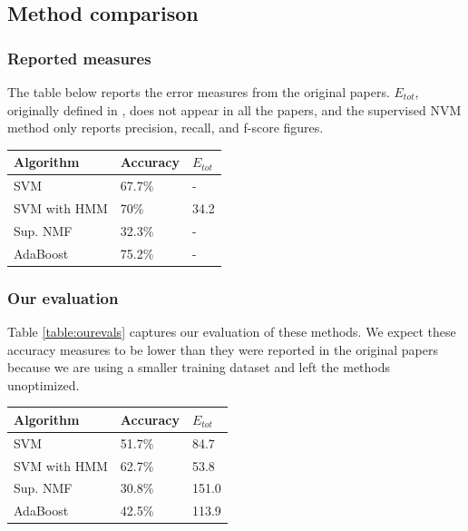 \documentclass[5p]{elsarticle}
\begin{document}
\subsection{Method comparison}

\subsubsection{Reported measures}
The table below reports the error measures from the original papers. $E_{tot}$, originally defined in \citet{poliner2006discriminative}, does not appear in all the papers, and the supervised NVM method only reports precision, recall, and f-score figures. 

\begin{center}
\begin{tabular}{|l|l|l|}
\hline
Algorithm & Accuracy & $E_{tot}$ \\ \hline
SVM & 67.7\% & - \\ \hline
SVM with HMM & 70\% & 34.2 \\ \hline
Sup. NMF & 32.3\% & - \\ \hline
AdaBoost & 75.2\% & - \\ \hline
\end{tabular}
\end{center}

\subsubsection{Our evaluation}

Table \ref{table:ourevals} captures our evaluation of these methods. We expect these accuracy measures to be lower than they were reported in the original papers because we are using a smaller training dataset and left the methods unoptimized.

\begin{center}
\label{table:ourevals}
\begin{tabular}{|l|l|l|}
\hline

Algorithm & Accuracy & $E_{tot}$ \\ \hline
SVM & 51.7\% & 84.7  \\ \hline
SVM with HMM & 62.7\% & 53.8  \\ \hline
Sup. NMF & 30.8\% & 151.0 \\ \hline
AdaBoost & 42.5\% & 113.9 \\ \hline

\end{tabular}

\end{center}
\end{document}
